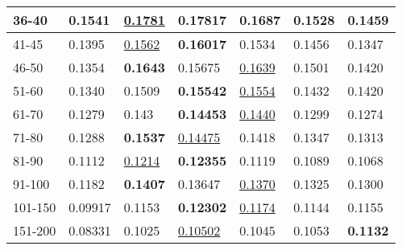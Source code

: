 \begin{table*}[]
\begin{tabular}{|l|l|l|l|l|l|l|}
        36-40     & 0.1541                         & \underline{0.1781}             & \textbf{0.17817}               & 0.1687                         & 0.1528                         & 0.1459                         \\ \hline
        41-45     & 0.1395                         & \underline{0.1562}             & \textbf{0.16017}               & 0.1534                         & 0.1456                         & 0.1347                         \\ \hline
        46-50     & 0.1354                         & \textbf{0.1643}                & 0.15675                        & \underline{0.1639}             & 0.1501                         & 0.1420                         \\ \hline
        51-60     & 0.1340                         & 0.1509                         & \textbf{0.15542}               & \underline{0.1554}             & 0.1432                         & 0.1420                         \\ \hline
        61-70     & 0.1279                         & 0.143                          & \textbf{0.14453}               & \underline{0.1440}             & 0.1299                         & 0.1274                         \\ \hline
        71-80     & 0.1288                         & \textbf{0.1537}                & \underline{0.14475}            & 0.1418                         & 0.1347                         & 0.1313                         \\ \hline
        81-90     & 0.1112                         & \underline{0.1214}             & \textbf{0.12355}               & 0.1119                         & 0.1089                         & 0.1068                         \\ \hline
        91-100    & 0.1182                         & \textbf{0.1407}                & 0.13647                        & \underline{0.1370}             & 0.1325                         & 0.1300                         \\ \hline
        101-150   & 0.09917                        & 0.1153                         & \textbf{0.12302}               & \underline{0.1174}             & 0.1144                         & 0.1155                         \\ \hline
        151-200   & 0.08331                        & 0.1025                         & \underline{0.10502}            & 0.1045                         & 0.1053                         & \textbf{0.1132}                \\ \hline

\end{tabular}
\end{table*}
